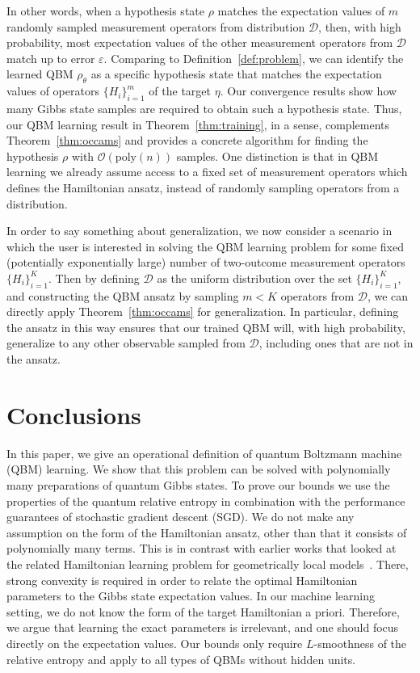 \documentclass[
    reprint,
    aps,
    prx,
    longbibliography
]{revtex4-2}
\begin{document}
In other words, when a hypothesis state $\rho$ matches the expectation values of $m$ randomly sampled measurement operators from distribution $\mathcal{D}$, then, with high probability, most expectation values of the other measurement operators from $\mathcal{D}$ match up to error $\varepsilon$. Comparing to Definition~\ref{def:problem}, we can identify the learned QBM $\rho_\theta$ as a specific hypothesis state that matches the expectation values of operators $\{H_i\}_{i=1}^m$ of the target $\eta$. Our convergence results show how many Gibbs state samples are required to obtain such a hypothesis state. Thus, our QBM learning result in Theorem~\ref{thm:training}, in a sense, complements Theorem~\ref{thm:occams} and provides a concrete algorithm for finding the hypothesis $\rho$ with $\mathcal{O}(\mathrm{poly}(n))$ samples. One distinction is that in QBM learning we already assume access to a fixed set of measurement operators which defines the Hamiltonian ansatz, instead of randomly sampling operators from a distribution. 

In order to say something about generalization, we now consider a scenario in which the user is interested in solving the QBM learning problem for some fixed (potentially exponentially large) number of two-outcome measurement operators $\{H_i\}_{i=1}^{K}$. Then by defining $\mathcal{D}$ as the uniform distribution over the set $\{H_i\}_{i=1}^{K}$, and constructing the QBM ansatz by sampling $m < K$ operators from $\mathcal{D}$, we can directly apply Theorem~\ref{thm:occams} for generalization. In particular, defining the ansatz in this way ensures that our trained QBM will, with high probability, generalize to any other observable sampled from $\mathcal{D}$, including ones that are not in the ansatz.

\section*{Conclusions}

In this paper, we give an operational definition of quantum Boltzmann machine (QBM) learning. We show that this problem can be solved with polynomially many preparations of quantum Gibbs states. To prove our bounds we use the properties of the quantum relative entropy in combination with the performance guarantees of stochastic gradient descent (SGD). We do not make any assumption on the form of the Hamiltonian ansatz, other than that it consists of polynomially many terms. This is in contrast with earlier works that looked at the related Hamiltonian learning problem for geometrically local models~\cite{Anshu_2021, Haah_2024}. There, strong convexity is required in order to relate the optimal Hamiltonian parameters to the Gibbs state expectation values. In our machine learning setting, we do not know the form of the target Hamiltonian a priori. Therefore, we argue that learning the exact parameters is irrelevant, and one should focus directly on the expectation values. Our bounds only require $L$-smoothness of the relative entropy and apply to all types of QBMs without hidden units.
\end{document}
